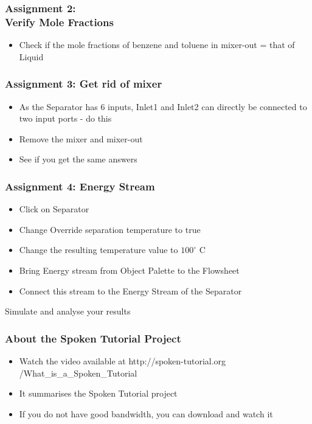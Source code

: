 \documentclass[17pt,xcolor=table]{beamer}
\begin{document}
\begin{frame}
  \frametitle{Assignment 2: \\ Verify Mole Fractions}
  \begin{itemize}
  \item Check if the mole fractions of benzene and toluene in
    {\color{blue}mixer-out} = that of {\color{blue}Liquid}
  \end{itemize}
\end{frame}

\begin{frame}
  \frametitle{Assignment 3: Get rid of mixer}
  \begin{itemize}
  \item As the {\color{blue}Separator} has 6 inputs,
    {\color{blue}Inlet1} and {\color{blue}Inlet2} can directly
    be connected to two input ports - do this
  \item Remove the {\color{blue}mixer} and {\color{blue}mixer-out}
  \item See if you get the same answers
  \end{itemize}
\end{frame}

\begin{frame}
  \frametitle{Assignment 4: Energy Stream}
  \vspace{-0.2in}
   \begin{itemize}
   \item Click on Separator
   \item Change {\color{blue}Override separation temperature} to true
   \item Change the resulting temperature value to $100^\circ$ C
   \item Bring {\color{blue}Energy stream} from {\color{blue}Object
       Palette} to the Flowsheet
   \item Connect this stream to the {\color{blue}Energy Stream} of the
     {\color{blue}Separator }
   \end{itemize}
Simulate and analyse your results
\end{frame}

\begin{frame}
\frametitle{About the Spoken Tutorial Project}
\begin{itemize}
\item Watch the video available at {\color{blue} http://spoken-tutorial.org /What\_is\_a\_Spoken\_Tutorial}
\item It summarises the Spoken Tutorial project \pause
\item If you do not have good bandwidth, you can download and watch it
\end{itemize}
\end{frame}
\end{document}
